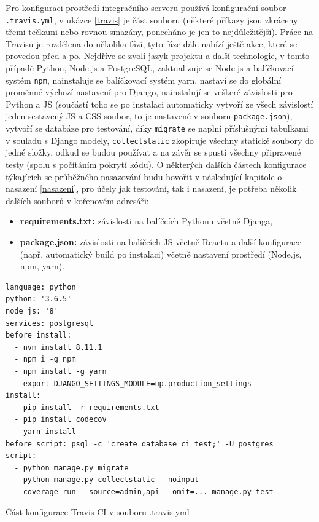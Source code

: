     Pro konfiguraci prostředí integračního serveru používá konfigurační soubor \verb|.travis.yml|, v ukázce \ref{travis} je část souboru (některé příkazy jsou zkráceny třemi tečkami nebo rovnou smazány, ponecháno je jen to nejdůležitější). Práce na Travisu je rozdělena do několika fází, tyto fáze dále nabízí ještě akce, které se provedou před a po. Nejdříve se zvolí jazyk projektu a další technologie, v tomto případě Python, Node.js a PostgreSQL, zaktualizuje se Node.js a balíčkovací systém \verb|npm|, nainstaluje se balíčkovací systém yarn, nastaví se do globální proměnné výchozí nastavení pro Django, nainstalují se veškeré závislosti pro Python a JS (součástí toho se po instalaci automaticky vytvoří ze všech závislostí jeden sestavený JS a CSS soubor, to je nastavené v souboru \verb|package.json|), vytvoří se databáze pro testování, díky \verb|migrate| se naplní příslušnými tabulkami v souladu s Django modely, \verb|collectstatic| zkopíruje všechny statické soubory do jedné složky, odkud se budou používat a na závěr se spustí všechny připravené testy (spolu s počítáním pokrytí kódu). O některých dalších částech konfigurace týkajících se průběžného nasazování budu hovořit v následující kapitole o nasazení \ref{nasazeni}, pro účely jak testování, tak i nasazení, je potřeba několik dalších souborů v kořenovém adresáři:
    \begin{itemize}
        \item \textbf{requirements.txt:} závislosti na balíčcích Pythonu včetně Djanga,
        \item \textbf{package.json:} závislosti na balíčcích JS včetně Reactu a další konfigurace (např. automatický build po instalaci) včetně nastavení prostředí (Node.js, npm, yarn).
    \end{itemize}
    
    \begin{listing}[ht]
    	\begin{verbatim}
language: python
python: '3.6.5'
node_js: '8'
services: postgresql
before_install:
  - nvm install 8.11.1
  - npm i -g npm
  - npm install -g yarn
  - export DJANGO_SETTINGS_MODULE=up.production_settings
install:
  - pip install -r requirements.txt
  - pip install codecov
  - yarn install
before_script: psql -c 'create database ci_test;' -U postgres
script:
  - python manage.py migrate
  - python manage.py collectstatic --noinput
  - coverage run --source=admin,api --omit=... manage.py test
    	\end{verbatim}
    	\caption{Část konfigurace Travis CI v souboru .travis.yml}\label{travis}
    \end{listing}
    
